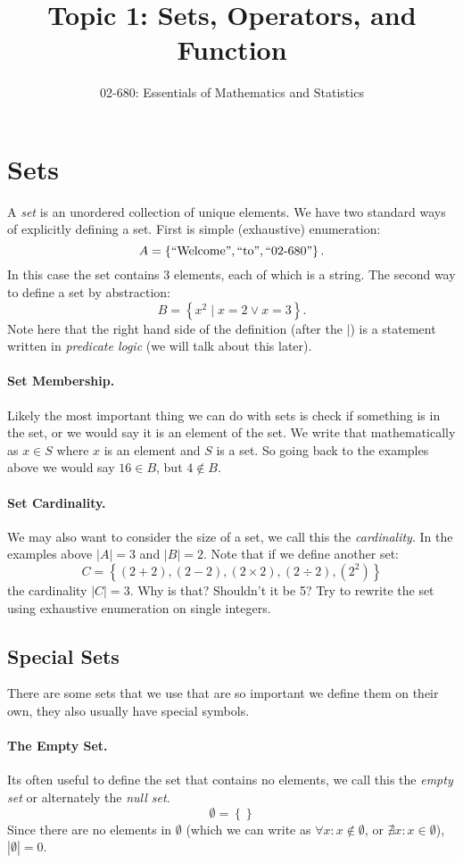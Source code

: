 \documentclass[11pt, oneside]{article}   	%
\title{Topic 1: Sets, Operators, and Function}
\author{02-680: Essentials of Mathematics and Statistics}
\begin{document}
\maketitle

\section{Sets}
A \emph{set} is an unordered collection of unique elements. 
We have two standard ways of explicitly defining a set. 
First is simple (exhaustive) enumeration:
\[
A = \left\{\textnormal{``Welcome''}, \textnormal{``to''}, \textnormal{``02-680''}\right\}.
\]
In this case the set contains 3 elements, each of which is a string.
The second way to define a set by abstraction:
\[
B = \left\{x^2 \mid x=2 \vee x=3 \right\}.
\]
Note here that the right hand side of the definition (after the $\mid$) is a statement written in \emph{predicate logic} (we will talk about this later).

\paragraph{Set Membership.} Likely the most important thing we can do with sets is check if something is in the set, 
or we would say it is an element of the set. 
We write that mathematically as $x \in S$ where $x$ is an element and $S$ is a set. 
So going back to the examples above we would say $16 \in B$, but $4 \notin B$.

\paragraph{Set Cardinality.} 
We may also want to consider the size of a set, we call this the \emph{cardinality}.
In the examples above $|A|=3$ and $|B| = 2$.
Note that if we define another set:
\[
C = \left\{ \left(2+2\right), \left(2-2\right), \left(2\times2\right), \left(2\div2\right), \left(2^2\right) \right\}
\]
the cardinality $|C|=3$. 
Why is that? Shouldn't it be 5? 
Try to rewrite the set using exhaustive enumeration on single integers.

\subsection{Special Sets}
There are some sets that we use that are so important we define them on their own, they also usually have special symbols. 

\paragraph{The Empty Set.} 
Its often useful to define the set that contains no elements, we call this the \emph{empty set} or alternately the \emph{null set}. 
\[
\emptyset = \left\{\right\}
\]
Since there are no elements in $\emptyset$ (which we can write as $\forall x: x \notin \emptyset$, or $\nexists x: x \in \emptyset$), $|\emptyset| = 0$. 
\end{document}
